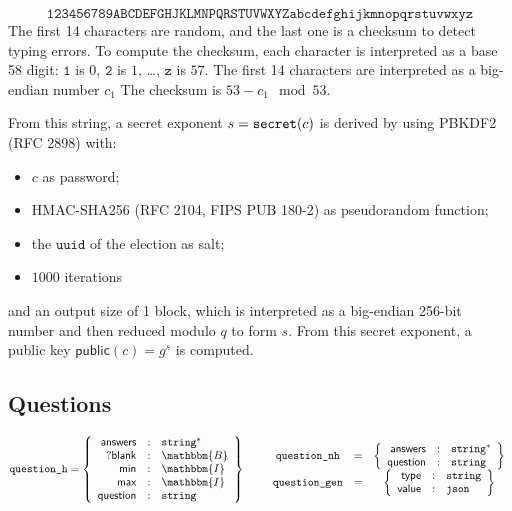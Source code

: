 \documentclass[a4paper]{article}
\newcommand{\I}{\mathbbm{I}}
\newcommand{\B}{\mathbbm{B}}
\newcommand{\public}{\textsf{public}}
\newcommand{\jstring}{\texttt{string}}
\newcommand{\uuid}{\texttt{uuid}}
\begin{document}
\[\texttt{123456789ABCDEFGHJKLMNPQRSTUVWXYZabcdefghijkmnopqrstuvwxyz}\]
The first 14 characters are random, and the last one is a checksum to
detect typing errors. To compute the checksum, each character is
interpreted as a base 58 digit: $\texttt{1}$ is $0$, $\texttt{2}$ is
$1$, \dots, $\texttt{z}$ is $57$. The first 14 characters are
interpreted as a big-endian number $c_1$ The checksum is $53-c_1\mod
53$.

From this string, a secret exponent $s=\texttt{secret}(c)$ is derived by using
PBKDF2 (RFC 2898) with:
\begin{itemize}
\item $c$ as password;
\item HMAC-SHA256 (RFC 2104, FIPS PUB 180-2) as pseudorandom function;
\item the $\uuid$ of the election as salt;
\item $1000$ iterations
\end{itemize}
and an output size of 1 block, which is interpreted as a big-endian
256-bit number and then reduced modulo $q$ to form $s$.  From this
secret exponent, a public key $\public(c)=g^s$ is computed.

\subsection{Questions}
\label{questions}

\newcommand{\question}{\texttt{question}}

\newcommand{\blank}{\textsf{blank}}
\newcommand{\minlabel}{\textsf{min}}
\newcommand{\maxlabel}{\textsf{max}}
\newcommand{\answers}{\textsf{answers}}

\begin{gather*}
  \texttt{question\_h}=\left\{
    \begin{array}{rcl}
      \answers&:&\jstring^\ast\\
      ?\blank&:&\B\\
      \minlabel&:&\I\\
      \maxlabel&:&\I\\
      \textsf{question}&:&\jstring
    \end{array}
  \right\}
  \qquad
  \begin{array}{ccc}
    \texttt{question\_nh}&=&\left\{
      \begin{array}{rcl}
        \answers&:&\jstring^\ast\\
        \textsf{question}&:&\jstring
      \end{array}
    \right\}\\
    \texttt{question\_gen}&=&\left\{
      \begin{array}{rcl}
        \textsf{type}&:&\jstring\\
        \textsf{value}&:&\texttt{json}
      \end{array}
    \right\}
  \end{array}
\end{gather*}
\end{document}
